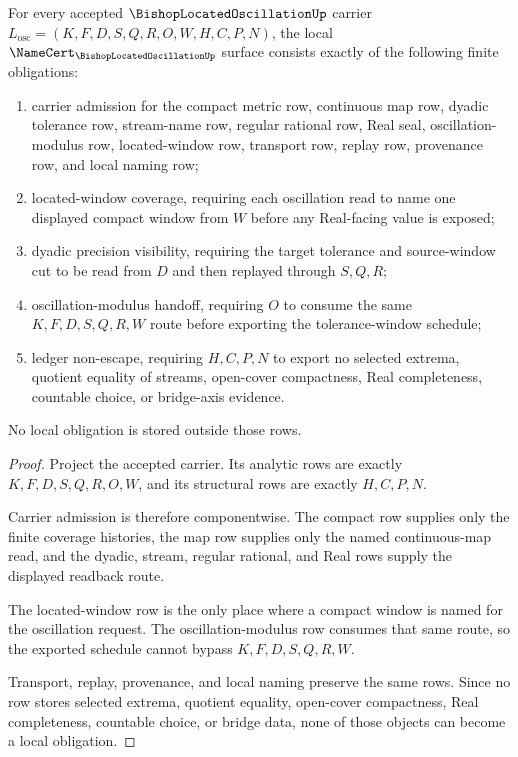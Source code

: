 \begin{theorem}
\label{thm:bishop-located-oscillation-namecert-obligations}
For every accepted $\BishopLocatedOscillationUp$ carrier $L_{\mathrm{osc}}=(K,F,D,S,Q,R,O,W,H,C,P,N)$, the local $\NameCert_{\BishopLocatedOscillationUp}$ surface consists exactly of the following finite obligations:
\begin{enumerate}
\item carrier admission for the compact metric row, continuous map row, dyadic tolerance row, stream-name row, regular rational row, Real seal, oscillation-modulus row, located-window row, transport row, replay row, provenance row, and local naming row;
\item located-window coverage, requiring each oscillation read to name one displayed compact window from $W$ before any Real-facing value is exposed;
\item dyadic precision visibility, requiring the target tolerance and source-window cut to be read from $D$ and then replayed through $S,Q,R$;
\item oscillation-modulus handoff, requiring $O$ to consume the same $K,F,D,S,Q,R,W$ route before exporting the tolerance-window schedule;
\item ledger non-escape, requiring $H,C,P,N$ to export no selected extrema, quotient equality of streams, open-cover compactness, Real completeness, countable choice, or bridge-axis evidence.
\end{enumerate}
No local obligation is stored outside those rows.
\end{theorem}
\begin{proof}
Project the accepted carrier. Its analytic rows are exactly $K,F,D,S,Q,R,O,W$, and its structural rows are exactly $H,C,P,N$.

Carrier admission is therefore componentwise. The compact row supplies only the finite coverage histories, the map row supplies only the named continuous-map read, and the dyadic, stream, regular rational, and Real rows supply the displayed readback route.

The located-window row is the only place where a compact window is named for the oscillation request. The oscillation-modulus row consumes that same route, so the exported schedule cannot bypass $K,F,D,S,Q,R,W$.

Transport, replay, provenance, and local naming preserve the same rows. Since no row stores selected extrema, quotient equality, open-cover compactness, Real completeness, countable choice, or bridge data, none of those objects can become a local obligation.
\end{proof}

